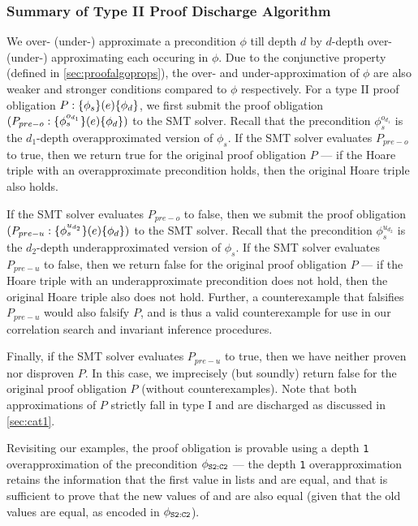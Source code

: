 \subsubsection{Summary of Type II Proof Discharge Algorithm}
\label{sec:cat2summary}
We over- (under-) approximate a precondition $\phi$ till depth $d$ by $d$-depth over- (under-) approximating
each \recursiveRelation{} occuring in $\phi$.
Due to the conjunctive \recursiveRelation{} property (defined in \cref{sec:proofalgoprops}),
the over- and under-approximation of $\phi$ are also weaker and stronger conditions compared to $\phi$
respectively.
For a type II proof obligation $P: \{\phi_s\}(e)\{\phi_d\}$, we first
submit the proof obligation $(P_{pre-o}: \{\phi^{o_{d_1}}_s\}(e)\{\phi_d\})$
to the SMT solver. Recall that the precondition $\phi^{o_{d_1}}_s$
is the $d_1$-depth overapproximated version of $\phi_s$.
If the SMT solver evaluates $P_{{pre-o}}$ to true, then we return true for
the original proof obligation $P$ --- if the
Hoare triple with an overapproximate precondition
holds, then the original Hoare triple
also holds.

If the SMT solver evaluates $P_{pre-o}$ to false, then we submit
the proof obligation $(P_{pre-u}: \{\phi^{u_{d_2}}_s\}(e)\{\phi_d\})$
to the SMT solver. Recall that the precondition $\phi^{u_{d_2}}_s$
is the $d_2$-depth underapproximated version of $\phi_s$.
If the SMT solver evaluates $P_{pre-u}$ to false, then we return false for
the original proof obligation $P$ --- if the
Hoare triple with an underapproximate precondition
does not hold, then the original Hoare triple
also does not hold. Further, a counterexample that
falsifies $P_{pre-u}$ would also falsify $P$,
and is thus a valid counterexample for use in our correlation search and invariant inference procedures.

Finally, if the SMT solver evaluates $P_{pre-u}$ to true, then we have neither
proven nor disproven $P$.
In this case, we imprecisely (but soundly) return false for the
original proof obligation $P$ (without counterexamples).
Note that both approximations of $P$ strictly fall in type I and are
discharged as discussed in \cref{sec:cat1}.

Revisiting our examples, the proof obligation 
is provable using a depth {\tt 1} overapproximation of the
precondition $\phi_{{\tt S2:C2}}$ --- the depth {\tt 1} overapproximation retains the
information that the first value in lists  and 
are equal, and that is sufficient to prove that
the new values of  and  are also equal
(given that the old values are equal, as encoded in $\phi_{{\tt S2:C2}}$).

